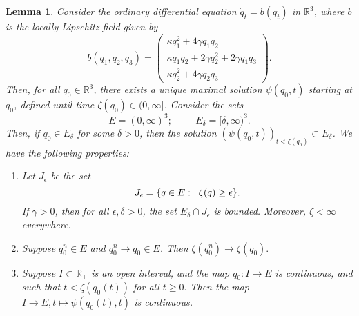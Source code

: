 \documentclass[11pt, notitlepage]{article}
\newtheorem{lem}[thm]{Lemma}
\begin{document}
\begin{lem}\label{lemma: ODE considerations} Consider the ordinary differential equation $\dot{q}_t=b(q_t)$ in $\mathbb{R}^3$, where $b$ is the locally Lipschitz field given by \begin{equation} \label{eq: system of ODEs} b(q_1,q_2,q_3)=\begin{pmatrix}\kappa q_1^2+4\gamma q_1q_2 \\ \kappa q_1q_2+2\gamma q_2^2+2\gamma q_1q_3 \\ \kappa q_2^2 + 4\gamma q_2q_3 \end{pmatrix}. \end{equation} Then, for all $q_0\in \mathbb{R}^3$, there exists a unique maximal solution $\psi(q_0, t)$ starting at $q_0$, defined until time $\zeta(q_0)\in (0, \infty]$. Consider the sets \begin{equation} E=(0, \infty)^3; \hspace{1cm} E_\delta=[\delta,\infty)^3.\end{equation} Then, if $q_0 \in E_\delta$ for some $\delta>0$, then the solution $(\psi(q_0,t))_{t<\zeta(q_0)} \subset E_\delta$. We have the following properties: \begin{enumerate}[label=\roman{*}).] \item Let $J_\epsilon$ be the set \begin{equation} J_\epsilon  =\{q \in E: \hspace{0.2cm} \zeta(q)\ge\epsilon\}.\end{equation} If $\gamma>0$, then for all $\epsilon, \delta>0$, the set $E_\delta \cap J_\epsilon $ is bounded. Moreover, $\zeta<\infty$ everywhere. \item Suppose $q^n_0 \in E$ and $q^n_0 \rightarrow q_0 \in E$. Then $\zeta(q^n_0)\rightarrow \zeta(q_0).$ \item Suppose $I\subset \mathbb{R}_+$ is an open interval, and the map $q_0: I\rightarrow E$ is continuous, and such that $t<\zeta(q_0(t))$ for all $t\ge 0.$ Then the map $I\rightarrow E, t\mapsto \psi(q_0(t), t)$ is continuous. 
 \end{enumerate} \end{lem} 
\end{document}
